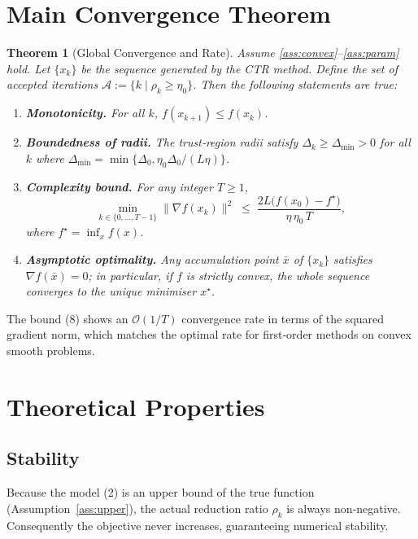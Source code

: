 \documentclass[11pt]{article}
\newtheorem{theorem}{Theorem}
\begin{document}
\section{Main Convergence Theorem}
\begin{theorem}[Global Convergence and Rate]\label{thm:main}
Assume \ref{ass:convex}–\ref{ass:param} hold. Let \(\{x_k\}\) be the sequence generated by the CTR method.
Define the set of \emph{accepted} iterations 
\(\mathcal{A}:=\{k\mid\rho_k\ge\eta_0\}\).
Then the following statements are true:

\begin{enumerate}[label=(\roman*)]
\item \textbf{Monotonicity.} For all \(k\), \(f(x_{k+1})\le f(x_k)\).
\item \textbf{Boundedness of radii.} The trust‑region radii satisfy 
\(\Delta_k\ge \Delta_{\min}>0\) for all \(k\) where
\(\Delta_{\min}= \min\{\Delta_0,\eta_0\Delta_0/(L\eta)\}\).
\item \textbf{Complexity bound.} For any integer \(T\ge 1\),
\[
\min_{k\in\{0,\dots,T-1\}}\|\nabla f(x_k)\|^2
\;\le\;
\frac{2L\bigl(f(x_0)-f^{\star}\bigr)}{\eta\,\eta_0\,T},
\tag{8}
\]
where \(f^{\star}= \inf_{x} f(x)\).
\item \textbf{Asymptotic optimality.} Any accumulation point \(\bar x\) of \(\{x_k\}\) satisfies
\(\nabla f(\bar x)=0\); in particular, if \(f\) is strictly convex, the whole sequence converges to the unique minimiser \(x^{\star}\).
\end{enumerate}
\end{theorem}
The bound (8) shows an \(\mathcal{O}(1/T)\) convergence rate in terms of the squared gradient norm, which matches the optimal rate for first‑order methods on convex smooth problems.

\section{Theoretical Properties}
\subsection{Stability}
Because the model (2) is an upper bound of the true function (Assumption~\ref{ass:upper}), the actual reduction ratio \(\rho_k\) is always non‑negative. Consequently the objective never increases, guaranteeing numerical stability.
\end{document}
